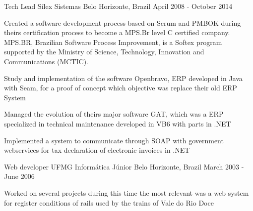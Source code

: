 \begin{cventries}
  \cventry
    {Tech Lead} %
    {Sílex Sistemas} %
    {Belo Horizonte, Brazil} %
    {April 2008 - October 2014} %
    {
      \begin{cvitems} %
        \item {Created a software development process based on Scrum and PMBOK during theirs certification process to become a MPS.Br level C certified company. MPS.BR, Brazilian Software Process Improvement, is a Softex program supported by the Ministry of Science, Technology, Innovation and Communications (MCTIC).}      
        \item {Study and implementation of the software Openbravo, ERP developed in Java with Seam, for a proof of concept which objective was replace their old ERP System}      
        \item {Managed the evolution of theirs major software GAT, which was a ERP specialized in technical maintenance developed in VB6 with parts in .NET}
        \item {Implemented a system to communicate through SOAP  with government webservices for tax declaration of electronic invoices in .NET}
      \end{cvitems}
    }

  \cventry
    {Web developer} %
    {UFMG Informática Júnior} %
    {Belo Horizonte, Brazil} %
    {March 2003 - June 2006} %
    {
      \begin{cvitems} %
        \item {Worked on several projects during this time the most relevant was a web system for register conditions of rails used by the trains of Vale do Rio Doce}
      \end{cvitems}
    }

\end{cventries}
